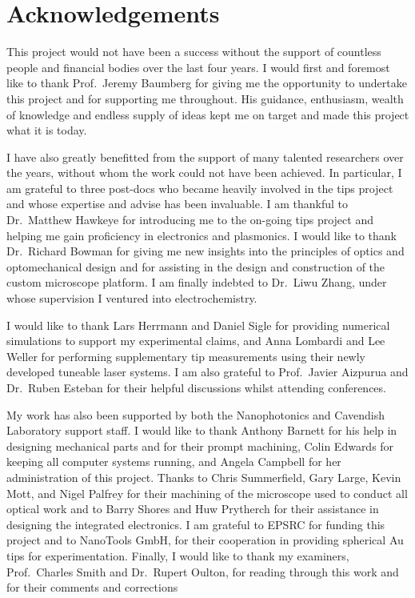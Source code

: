 \documentclass[12pt, a4paper, oneside]{book}
\begin{document}
\newpage
\section*{Acknowledgements}

This project would not have been a success without the support of countless people and financial bodies over the last four years.
I would first and foremost like to thank Prof.\ Jeremy Baumberg for giving me the opportunity to undertake this project and for supporting me throughout. His guidance, enthusiasm, wealth of knowledge and endless supply of ideas kept me on target and made this project what it is today.

I have also greatly benefitted from the support of many talented researchers over the years, without whom the work could not have been achieved. In particular, I am grateful to three post-docs who became heavily involved in the tips project and whose expertise and advise has been invaluable. I am thankful to Dr.\ Matthew Hawkeye for introducing me to the on-going tips project and helping me gain proficiency in electronics and plasmonics. I would like to thank Dr.\ Richard Bowman for giving me new insights into the principles of optics and optomechanical design and for assisting in the design and construction of the custom microscope platform. I am finally indebted to Dr.\ Liwu Zhang, under whose supervision I ventured into electrochemistry.

I would like to thank Lars Herrmann and Daniel Sigle for providing numerical simulations to support my experimental claims, and Anna Lombardi and Lee Weller for performing supplementary tip measurements using their newly developed tuneable laser systems. I am also grateful to Prof.\ Javier Aizpurua and Dr.\ Ruben Esteban for their helpful discussions whilst attending conferences.

My work has also been supported by both the Nanophotonics and Cavendish Laboratory support staff. I would like to thank Anthony Barnett for his help in designing mechanical parts and for their prompt machining, Colin Edwards for keeping all computer systems running, and Angela Campbell for her administration of this project. Thanks to Chris Summerfield, Gary Large, Kevin Mott, and Nigel Palfrey for their machining of the microscope used to conduct all optical work and to Barry Shores and Huw Prytherch for their assistance in designing the integrated electronics. I am grateful to EPSRC for funding this project and to NanoTools GmbH, for their cooperation in providing spherical Au tips for experimentation. Finally, I would like to thank my examiners, Prof.\ Charles Smith and Dr.\ Rupert Oulton, for reading through this work and for their comments and corrections
\end{document}
